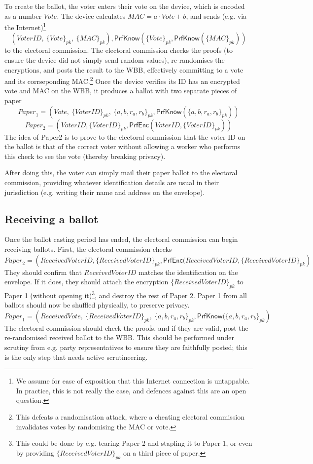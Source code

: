 \documentclass[11pt,twoside,a4paper]{article}
\newcommand{\PrfEnc}{\mathsf{PrfEnc}}
\newcommand{\PrfKnow}{\mathsf{PrfKnow}}
\theoremstyle{definition}
\newcommand{\Vote}{\mathit{Vote}}
\newcommand{\VoterID}{\mathit{VoterID}}
\newcommand{\Paper}{\mathit{Paper}}
\newcommand{\Mac}{\mathit{MAC}}
\begin{document}
To create the ballot, the voter enters their vote on the device, which is encoded as a number \(\Vote\). The device calculates \(\Mac=a\cdot \Vote+b\), and sends (e.g. via the Internet)\footnote{We assume for ease of exposition that this Internet connection is untappable. In practice, this is not really the case, and defences against this are an open question.}
\[\left(\VoterID,\ \{\Vote\}_{pk},\ \{\Mac\}_{pk}\right), \PrfKnow(\{\Vote\}_{pk}, \PrfKnow(\{\Mac\}_{pk}))\]
to the electoral commission. The electoral commission checks the proofs (to ensure the device did not simply send random values), re-randomises the encryptions, and posts the result to the WBB, effectively committing to a vote and its corrseponding MAC.\footnote{This defeats a randomisation attack, where a cheating electoral commission invalidates votes by randomising the MAC or vote.} Once the device verifies its ID has an encrypted vote and MAC on the WBB, it produces a ballot with two separate pieces of paper
\[\Paper_1 = \left(\Vote,\ \{\VoterID\}_{pk},\ \{a,b,r_a,r_b\}_{pk}, \PrfKnow(\{a,b,r_a,r_b\}_{pk})\right)\]
\[\Paper_2 = \left(\VoterID, \{\VoterID\}_{pk}, \PrfEnc(\VoterID, \{\VoterID\}_{pk})\right)\]
The idea of Paper2 is to prove to the electoral commission that the voter ID on the ballot is that of the correct voter without allowing a worker who performs this check to see the vote (thereby breaking privacy).

After doing this, the voter can simply mail their paper ballot to the electoral commission, providing whatever identification details are usual in their jurisdiction (e.g. writing their name and address on the envelope).
\subsection{Receiving a ballot}
Once the ballot casting period has ended, the electoral commission can begin receiving ballots. First, the electoral commission checks
\[\Paper_2=\left(ReceivedVoterID, \{ReceivedVoterID\}_{pk},\PrfEnc(ReceivedVoterID, \{ReceivedVoterID\}_{pk}\right)\]
They should confirm that \(ReceivedVoterID\) matches the identification on the envelope. If it does, they should attach the encryption \(\{ReceivedVoterID\}_{pk}\) to Paper 1 (without opening it)\footnote{This could be done by e.g. tearing Paper 2 and stapling it to Paper 1, or even by providing \(\{ReceivedVoterID\}_{pk}\) on a third piece of paper.}, and destroy the rest of Paper 2. Paper 1 from all ballots should now be shuffled physically, to preserve privacy.
\[\Paper_1=\left(ReceivedVote,\ \{ReceivedVoterID\}_{pk},\ \{a,b,r_a,r_b\}_{pk}, \PrfKnow(\{a,b,r_a,r_b\}_{pk}\right)\]
The electoral commission should check the proofs, and if they are valid, post the re-randomised received ballot to the WBB. This should be performed under scrutiny from e.g. party representatives to ensure they are faithfully posted; this is the only step that needs active scrutineering.
\end{document}
